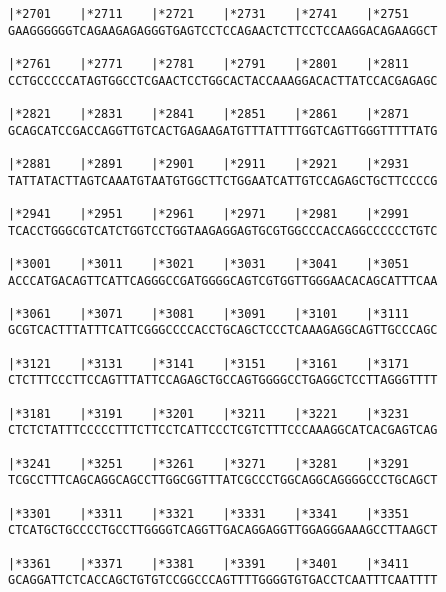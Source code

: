 \documentclass{article}
\begin{document}
\begin{Verbatim}
|*2701    |*2711    |*2721    |*2731    |*2741    |*2751    
GAAGGGGGGTCAGAAGAGAGGGTGAGTCCTCCAGAACTCTTCCTCCAAGGACAGAAGGCT
                                                            
|*2761    |*2771    |*2781    |*2791    |*2801    |*2811    
CCTGCCCCCATAGTGGCCTCGAACTCCTGGCACTACCAAAGGACACTTATCCACGAGAGC
                                                            
|*2821    |*2831    |*2841    |*2851    |*2861    |*2871    
GCAGCATCCGACCAGGTTGTCACTGAGAAGATGTTTATTTTGGTCAGTTGGGTTTTTATG
                                                            
|*2881    |*2891    |*2901    |*2911    |*2921    |*2931    
TATTATACTTAGTCAAATGTAATGTGGCTTCTGGAATCATTGTCCAGAGCTGCTTCCCCG
                                                            
|*2941    |*2951    |*2961    |*2971    |*2981    |*2991    
TCACCTGGGCGTCATCTGGTCCTGGTAAGAGGAGTGCGTGGCCCACCAGGCCCCCCTGTC
                                                            
|*3001    |*3011    |*3021    |*3031    |*3041    |*3051    
ACCCATGACAGTTCATTCAGGGCCGATGGGGCAGTCGTGGTTGGGAACACAGCATTTCAA
                                                            
|*3061    |*3071    |*3081    |*3091    |*3101    |*3111    
GCGTCACTTTATTTCATTCGGGCCCCACCTGCAGCTCCCTCAAAGAGGCAGTTGCCCAGC
                                                            
|*3121    |*3131    |*3141    |*3151    |*3161    |*3171    
CTCTTTCCCTTCCAGTTTATTCCAGAGCTGCCAGTGGGGCCTGAGGCTCCTTAGGGTTTT
                                                            
|*3181    |*3191    |*3201    |*3211    |*3221    |*3231    
CTCTCTATTTCCCCCTTTCTTCCTCATTCCCTCGTCTTTCCCAAAGGCATCACGAGTCAG
                                                            
|*3241    |*3251    |*3261    |*3271    |*3281    |*3291    
TCGCCTTTCAGCAGGCAGCCTTGGCGGTTTATCGCCCTGGCAGGCAGGGGCCCTGCAGCT
                                                            
|*3301    |*3311    |*3321    |*3331    |*3341    |*3351    
CTCATGCTGCCCCTGCCTTGGGGTCAGGTTGACAGGAGGTTGGAGGGAAAGCCTTAAGCT
                                                            
|*3361    |*3371    |*3381    |*3391    |*3401    |*3411    
GCAGGATTCTCACCAGCTGTGTCCGGCCCAGTTTTGGGGTGTGACCTCAATTTCAATTTT
                                                            

\end{Verbatim}
\end{document}
